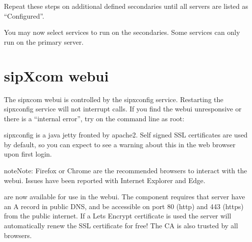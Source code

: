 \documentclass[letterpaper,10pt,english]{sphinxmanual}
\begin{document}
Repeat these steps on additional defined secondaries until all servers are listed as “Configured”.
\begin{quote}

\end{quote}

You may now select services to run on the secondaries. Some services can only run on the primary server.
\begin{quote}

\end{quote}

\ignorespaces 

\chapter{sipXcom webui}
\label{\detokenize{webui:sipxcom-webui}}\label{\detokenize{webui:index-0}}\label{\detokenize{webui::doc}}
The sipxcom webui is controlled by the sipxconfig service. Restarting the sipxconfig service will not interrupt calls. If you find the webui unresponsive or there is a “internal error”, try on the command line as root:

\begin{sphinxVerbatim}[commandchars=\\\{\}]
  
\end{sphinxVerbatim}

sipxconfig is a java jetty fronted by apache2. Self signed SSL certificates are used by default, so you can expect to see a warning about this in the web browser upon first login.

\begin{sphinxadmonition}{note}{Note:}
Firefox or Chrome are the recommended browsers to interact with the webui. Issues have been reported with Internet Explorer and Edge.
\end{sphinxadmonition}

 are now available for use in the webui.
The  component requires that server have an A record in public DNS, and be accessible on port 80 (http) and 443 (https) from the public internet.
If a Lets Encrypt certificate is used the server will automatically renew the SSL certificate \textendash{} for free! The CA is also trusted by all browsers.
\end{document}
